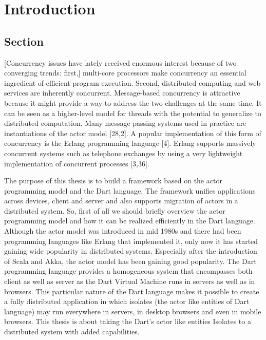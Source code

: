 \chapter{Introduction}\label{chapter:introduction}

\section{Section}
[Concurrency issues have lately received enormous interest because of two converging trends: first,] multi-core processors make concurrency an essential ingredient of efficient program execution. Second, distributed computing and web services are inherently concurrent. Message-based concurrency is attractive because it might provide a way to address the two challenges at the same time. It can be seen as a higher-level model for threads with the potential to generalize to distributed computation. Many message passing systems used in practice are instantiations of the actor model [28,2]. A popular implementation of this form of concurrency is the Erlang programming language [4]. Erlang supports massively concurrent systems such as telephone exchanges by using a very lightweight implementation of concurrent processes [3,36].~\parencite{Haller}

The purpose of this thesis is to build a framework based on the actor programming model and the Dart language. The framework unifies applications across devices, client and server and also supports migration of actors in a distributed system. So, first of all we should briefly overview the actor programming model and how it can be realized efficiently in the Dart language. Although the actor model was introduced in mid 1980s and there had been programming languages like Erlang that implemented it, only now it has started gaining wide popularity in distributed systems. Especially after the introduction of Scala and Akka, the actor model has been gaining good popularity. The Dart programming language provides a homogeneous system that encompasses both client as well as server as the Dart Virtual Machine runs in servers as well as in browsers. This particular nature of the Dart language makes it possible to create a fully distributed application in which isolates (the actor like entities of Dart language) may run everywhere \textemdash{} in servers, in desktop browsers and even in mobile browsers.
This thesis is about taking the Dart's actor like entities \textemdash{} Isolates to a distributed system with added capabilities.

